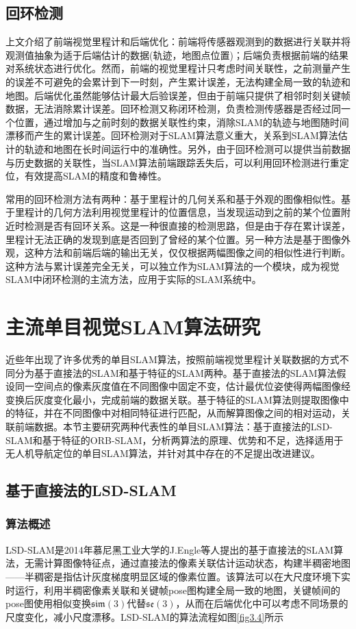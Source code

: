 \subsection{回环检测}
上文介绍了前端视觉里程计和后端优化：前端将传感器观测到的数据进行关联并将观测值抽象为适于后端估计的数据(轨迹，地图点位置)；后端负责根据前端的结果对系统状态进行优化。然而，前端的视觉里程计只考虑时间关联性，之前测量产生的误差不可避免的会累计到下一时刻，产生累计误差，无法构建全局一致的轨迹和地图。后端优化虽然能够估计最大后验误差，但由于前端只提供了相邻时刻关键帧数据，无法消除累计误差。回环检测又称闭环检测，负责检测传感器是否经过同一个位置，通过增加与之前时刻的数据关联性约束，消除SLAM的轨迹与地图随时间漂移而产生的累计误差。回环检测对于SLAM算法意义重大，关系到SLAM算法估计的轨迹和地图在长时间运行中的准确性。另外，由于回环检测可以提供当前数据与历史数据的关联性，当SLAM算法前端跟踪丢失后，可以利用回环检测进行重定位，有效提高SLAM的精度和鲁棒性。

常用的回环检测方法有两种\upcite{[3.7]}：基于里程计的几何关系和基于外观的图像相似性。基于里程计的几何方法利用视觉里程计的位置信息，当发现运动到之前的某个位置附近时检测是否有回环关系。这是一种很直接的检测思路，但是由于存在累计误差，里程计无法正确的发现到底是否回到了曾经的某个位置。另一种方法是基于图像外观，这种方法和前端后端的输出无关，仅仅根据两幅图像之间的相似性进行判断。这种方法与累计误差完全无关，可以独立作为SLAM算法的一个模块，成为视觉SLAM中闭环检测的主流方法，应用于实际的SLAM系统中。


\section{主流单目视觉SLAM算法研究}
近些年出现了许多优秀的单目SLAM算法，按照前端视觉里程计关联数据的方式不同分为基于直接法的SLAM和基于特征的SLAM两种。基于直接法的SLAM算法假设同一空间点的像素灰度值在不同图像中固定不变，估计最优位姿使得两幅图像经变换后灰度变化最小，完成前端的数据关联。基于特征的SLAM算法则提取图像中的特征，并在不同图像中对相同特征进行匹配，从而解算图像之间的相对运动，关联前端数据。本节主要研究两种代表性的单目SLAM算法：基于直接法的LSD-SLAM和基于特征的ORB-SLAM，分析两算法的原理、优势和不足，选择适用于无人机导航定位的单目SLAM算法，并针对其中存在的不足提出改进建议。

\subsection{基于直接法的LSD-SLAM}

\subsubsection{算法概述}
LSD-SLAM是2014年慕尼黑工业大学的J.Engle等人提出的基于直接法的SLAM算法，无需计算图像特征点，通过直接法的像素关联估计运动状态，构建半稠密地图——半稠密是指估计灰度梯度明显区域的像素位置。该算法可以在大尺度环境下实时运行，利用半稠密像素关联和关键帧pose图构建全局一致的地图，关键帧间的pose图使用相似变换$\mathfrak{sim}(3)$代替$\mathfrak{se}(3)$，从而在后端优化中可以考虑不同场景的尺度变化，减小尺度漂移。LSD-SLAM的算法流程\upcite{[1.21]}如图\ref{fig3.4}所示

